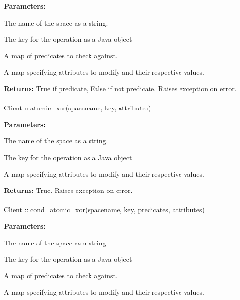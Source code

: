 \noindent\textbf{Parameters:}
\begin{description}[labelindent=\widthof{{\code{predicates}}},leftmargin=*,noitemsep,nolistsep,align=right]
\item[\code{spacename}] The name of the space as a string.
\item[\code{key}] The key for the operation as a Java object
\item[\code{predicates}] A map of predicates to check against.
\item[\code{attributes}] A map specifying attributes to modify and their respective values.
\end{description}

\noindent\textbf{Returns:}
True if predicate, False if not predicate.  Raises exception on error.

\paragraph{}
\label{api:java:atomic_xor}
\begin{javacode}
Client :: atomic_xor(spacename, key, attributes)
\end{javacode}


\noindent\textbf{Parameters:}
\begin{description}[labelindent=\widthof{{\code{attributes}}},leftmargin=*,noitemsep,nolistsep,align=right]
\item[\code{spacename}] The name of the space as a string.
\item[\code{key}] The key for the operation as a Java object
\item[\code{attributes}] A map specifying attributes to modify and their respective values.
\end{description}

\noindent\textbf{Returns:}
True.  Raises exception on error.

\paragraph{}
\label{api:java:cond_atomic_xor}
\begin{javacode}
Client :: cond_atomic_xor(spacename, key, predicates, attributes)
\end{javacode}


\noindent\textbf{Parameters:}
\begin{description}[labelindent=\widthof{{\code{predicates}}},leftmargin=*,noitemsep,nolistsep,align=right]
\item[\code{spacename}] The name of the space as a string.
\item[\code{key}] The key for the operation as a Java object
\item[\code{predicates}] A map of predicates to check against.
\item[\code{attributes}] A map specifying attributes to modify and their respective values.
\end{description}


